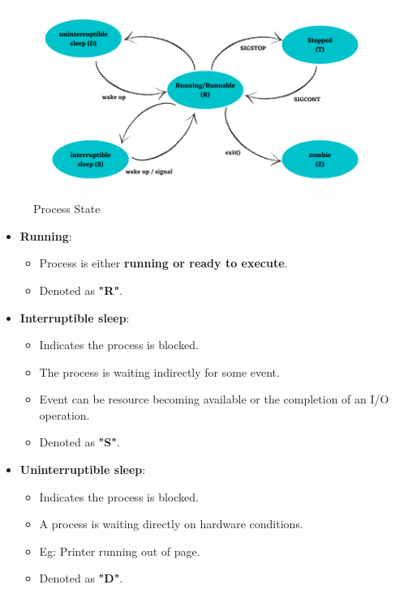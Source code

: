 \setlength{\columnsep}{3pt}
\begin{flushleft}
	
	\begin{figure}[h!]
		\centering
		\includegraphics[scale=0.5]{content/chapter12/images/state_process.png}
		\caption{Process State}
		\label{fig:process_state}
	\end{figure}
	
	\begin{itemize}
		\item \textbf{Running}: 
		\begin{itemize}
			\item Process is either \textbf{running or ready to execute}.
			\item Denoted as \textbf{"R"}.
		\end{itemize}

		
		\bigskip
		\item \textbf{Interruptible sleep}: 
		\begin{itemize}
			\item Indicates the process is blocked.
			\item The process is waiting indirectly for some event.
			\item Event can be resource becoming available or the completion of an I/O operation.
			\item Denoted as \textbf{"S"}.
		\end{itemize}
		
		
		\bigskip
		\item \textbf{Uninterruptible sleep}: 
		\begin{itemize}
			\item Indicates the process is blocked.
			\item A process is waiting directly on hardware conditions.
			\item Eg: Printer running out of page.
			\item Denoted as \textbf{"D"}.
		\end{itemize} 
		

\end{itemize}
\end{flushleft}
